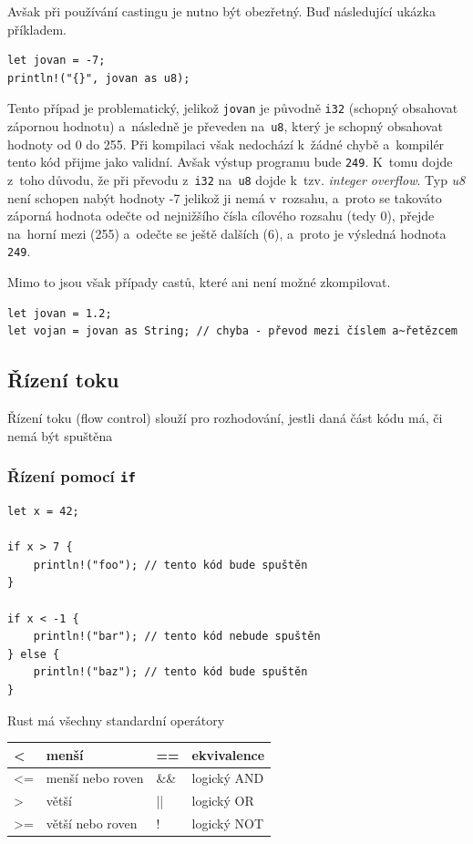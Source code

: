 \documentclass[a4paper, 12pt, twoside]{article} %
\newcommand{\rust}[1]{\texttt{#1}}
\begin{document}
			Avšak při používání castingu je nutno být obezřetný. Buď následující ukázka příkladem.
			\begin{verbatim}
let jovan = -7;
println!("{}", jovan as u8);
			\end{verbatim}
			
			Tento případ je problematický, jelikož \texttt{jovan} je původně \texttt{i32} (schopný obsahovat zápornou hodnotu) a~následně je převeden na~\texttt{u8}, který je schopný obsahovat hodnoty od 0 do 255. Při kompilaci však nedochází k~žádné chybě a~kompilér tento kód přijme jako validní. Avšak výstup programu bude \texttt{249}. K~tomu dojde z~toho důvodu, že při převodu z~\texttt{i32} na~\texttt{u8} dojde k~tzv. \textit{integer overflow}. Typ \textit{u8} není schopen nabýt hodnoty -7 jelikož ji nemá v~rozsahu, a~proto se takováto záporná hodnota odečte od nejnižšího čísla cílového rozsahu (tedy 0), přejde na~horní mezi (255) a~odečte se ještě dalších (6), a~proto je výsledná hodnota \texttt{249}.
			
			Mimo to jsou však případy castů, které ani není možné zkompilovat.
			\begin{verbatim}
let jovan = 1.2;
let vojan = jovan as String; // chyba - převod mezi číslem a~řetězcem
			\end{verbatim}

	\subsection{Řízení toku}
		Řízení toku (flow control) slouží pro rozhodování, jestli daná část kódu má, či nemá být spuštěna
	
	\subsubsection*{Řízení pomocí \rust{if}}
		\begin{verbatim}
let x = 42;

if x > 7 {
	println!("foo"); // tento kód bude spuštěn
}

if x < -1 {
	println!("bar"); // tento kód nebude spuštěn
} else {
	println!("baz"); // tento kód bude spuštěn
}
		\end{verbatim}
		
		Rust má všechny standardní operátory
			\begin{table}[h!]
				\centering
				\begin{tabular}{ll|ll}
					\hline
					\textless{} & menší & == & ekvivalence \\ \hline
					\textless{}= & menší nebo roven & \&\& & logický AND \\ \hline
					\textgreater{} & větší & || & logický OR \\ \hline
					\textgreater{}= & větší nebo roven & ! & logický NOT \\ \hline
				\end{tabular}
			\end{table}
		
\end{document}
